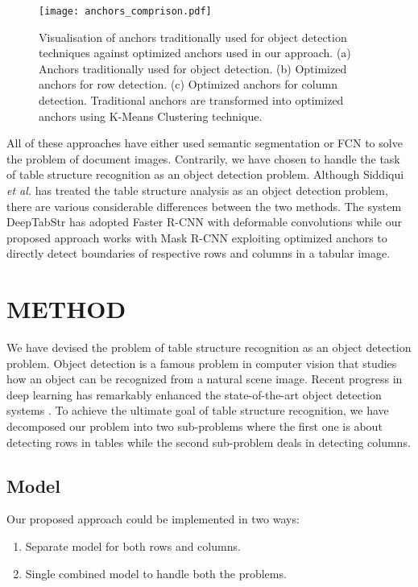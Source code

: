 \documentclass{ieeeaccess}
\begin{document}
\begin{figure*}[ht]
    \texttt{[image: anchors\_comprison.pdf]}
    \caption{Visualisation of anchors traditionally used for object detection techniques against optimized anchors used in our approach. (a)
    Anchors traditionally used for object detection. (b) Optimized anchors for row detection. (c) Optimized anchors for column detection. Traditional anchors are transformed into optimized anchors using K-Means Clustering technique. }
    \label{fig:anchors_comprison}
\end{figure*}

All of these approaches have either used semantic segmentation or FCN to solve the problem of document images. Contrarily, we have chosen to handle the task of table structure recognition as an object detection problem. Although Siddiqui \textit{et al.} \cite{b33} has treated the table structure analysis as an object detection problem, there are various considerable differences between the two methods. The system DeepTabStr \cite{b33} has adopted Faster R-CNN \cite{b34} with deformable convolutions \cite{b42} while our proposed approach works with Mask R-CNN \cite{b36} exploiting optimized anchors to directly detect boundaries of respective rows and columns in a tabular image.



\section{METHOD}
\label{sec:methodology}
We have devised the problem of table structure recognition as an object detection problem. Object detection is a famous problem in computer vision that studies how an object can be recognized from a natural scene image. Recent progress in deep learning has remarkably enhanced the state-of-the-art object detection systems \cite{b34, b36}. To achieve the ultimate goal of table structure recognition, we have decomposed our problem into two sub-problems where the first one is about detecting rows in tables while the second sub-problem deals in detecting columns.



\subsection{Model}


Our proposed approach could be implemented in two ways: 
\begin{enumerate}
    \item Separate model for both rows and columns.
    \item Single combined model to handle both the problems. 
\end{enumerate}
\end{document}
